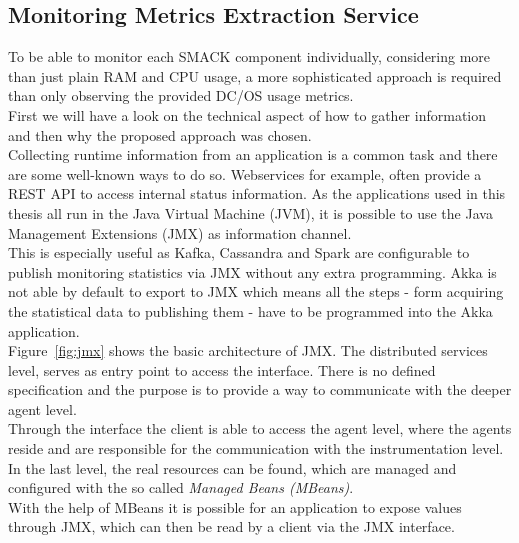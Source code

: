 \subsection{Monitoring Metrics Extraction Service}
\label{sec:jmx_extract_tool}

To be able to monitor each SMACK component individually, considering more than just plain RAM and CPU usage, a more sophisticated approach is required than only observing the provided DC/OS usage metrics.\\
First we will have a look on the technical aspect of how to gather information and then why the proposed approach was chosen.\\

Collecting runtime information from an application is a common task and there are some well-known ways to do so.
Webservices for example, often provide a REST API to access internal status information.
As the applications used in this thesis all run in the Java Virtual Machine (JVM), it is possible to use the Java Management Extensions (JMX) as information channel.\\
This is especially useful as Kafka, Cassandra and Spark are configurable to publish monitoring statistics via JMX without any extra programming.
Akka is not able by default to export to JMX which means all the steps - form acquiring the statistical data to publishing them - have to be programmed into the Akka application.\\

Figure~\ref{fig:jmx} shows the basic architecture of JMX.
The distributed services level, serves as entry point to access the interface.
There is no defined specification and the purpose is to provide a way to communicate with the deeper agent level.\\
Through the interface the client is able to access the agent level, where the agents reside and are responsible for the communication with the instrumentation level.
In the last level, the real resources can be found, which are managed and configured with the so called \textit{Managed Beans (MBeans)}.\\
With the help of MBeans it is possible for an application to expose values through JMX, which can then be read by a client via the JMX interface.\\

